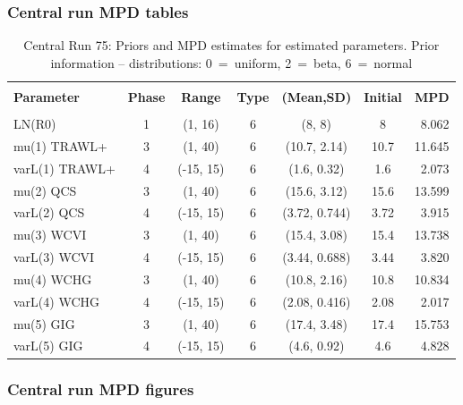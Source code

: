 \subsubsection{Central run MPD tables}

\setlength{\tabcolsep}{4pt}
\begin{table}[!h]
\centering
\caption{Central Run 75: Priors and MPD estimates for estimated parameters. Prior information -- distributions: 0~=~uniform, 2~=~beta, 6~=~normal}
\label{tab:ymr.parest}
\usefont{\encodingdefault}{\familydefault}{\seriesdefault}{\shapedefault}\small
\begin{tabular}{lcccccr}
\hline \\ [-1.5ex]
{\bf Parameter} & {\bf Phase} & {\bf Range} & {\bf Type} & {\bf (Mean,SD)} & {\bf Initial} & {\bf MPD} \\ [1ex]
\hline \\ [-1.5ex]
LN(R0) & 1 & (1, 16) & 6 & (8, 8) & 8 & 8.062 \\
mu(1) TRAWL+ & 3 & (1, 40) & 6 & (10.7, 2.14) & 10.7 & 11.645 \\
varL(1) TRAWL+ & 4 & (-15, 15) & 6 & (1.6, 0.32) & 1.6 & 2.073 \\
mu(2) QCS & 3 & (1, 40) & 6 & (15.6, 3.12) & 15.6 & 13.599 \\
varL(2) QCS & 4 & (-15, 15) & 6 & (3.72, 0.744) & 3.72 & 3.915 \\
mu(3) WCVI & 3 & (1, 40) & 6 & (15.4, 3.08) & 15.4 & 13.738 \\
varL(3) WCVI & 4 & (-15, 15) & 6 & (3.44, 0.688) & 3.44 & 3.820 \\
mu(4) WCHG & 3 & (1, 40) & 6 & (10.8, 2.16) & 10.8 & 10.834 \\
varL(4) WCHG & 4 & (-15, 15) & 6 & (2.08, 0.416) & 2.08 & 2.017 \\
mu(5) GIG & 3 & (1, 40) & 6 & (17.4, 3.48) & 17.4 & 15.753 \\
varL(5) GIG & 4 & (-15, 15) & 6 & (4.6, 0.92) & 4.6 & 4.828 \\
\hline
\end{tabular}
\usefont{\encodingdefault}{\familydefault}{\seriesdefault}{\shapedefault}\normalsize
\end{table}

\newpage
\subsubsection{Central run MPD figures}

